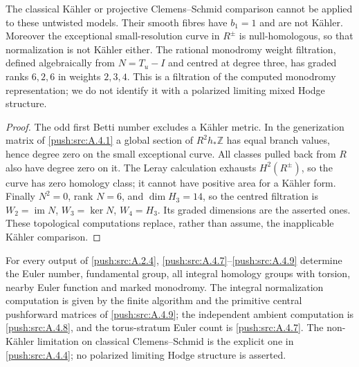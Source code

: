 \begin{proposition}\label{push:src:A.4.4}\label{push:A44}
The classical K\"ahler or projective Clemens--Schmid
comparison cannot be applied to these untwisted models.
Their smooth fibres have $b_1=1$ and are not K\"ahler.
Moreover the exceptional small-resolution curve in
$R^\pm$ is null-homologous, so that normalization is
not K\"ahler either. The rational monodromy weight
filtration, defined algebraically from $N=T_u-I$ and
centred at degree three, has graded ranks $6,2,6$ in
weights $2,3,4$. This is a filtration of the computed
monodromy representation; we do not identify it with
a polarized limiting mixed Hodge structure.
\end{proposition}

\begin{proof}
The odd first Betti number excludes a K\"ahler metric.
In the generization matrix of \ref{push:src:A.4.1} a global section of
$R^2h_*\mathbb Z$ has equal branch values, hence degree
zero on the small exceptional curve. All classes pulled
back from $R$ also have degree zero on it. The Leray
calculation exhausts $H^2(R^\pm)$, so the curve has
zero homology class; it cannot have positive area for
a K\"ahler form. Finally $N^2=0$, rank $N=6$, and
$\dim H_3=14$, so the centred filtration is
$W_2=\operatorname{im}N$, $W_3=\ker N$, $W_4=H_3$.
Its graded dimensions are the asserted ones. These
topological computations replace, rather than assume,
the inapplicable K\"ahler comparison.
\end{proof}

\begin{corollary}\label{push:src:A.4.5}\label{push:A45}
For every output of \ref{push:src:A.2.4}, \ref{push:src:A.4.7}--\ref{push:src:A.4.9} determine the
Euler number, fundamental group, all integral homology
groups with torsion, nearby Euler function and marked
monodromy. The integral normalization computation is
given by the finite algorithm and the primitive
central pushforward matrices of \ref{push:src:A.4.9}; the independent
ambient computation is \ref{push:src:A.4.8}, and the torus-stratum
Euler count is \ref{push:src:A.4.7}. The non-K\"ahler limitation on
classical Clemens--Schmid is the explicit one in
\ref{push:src:A.4.4}; no polarized limiting Hodge structure is
asserted.
\end{corollary}


